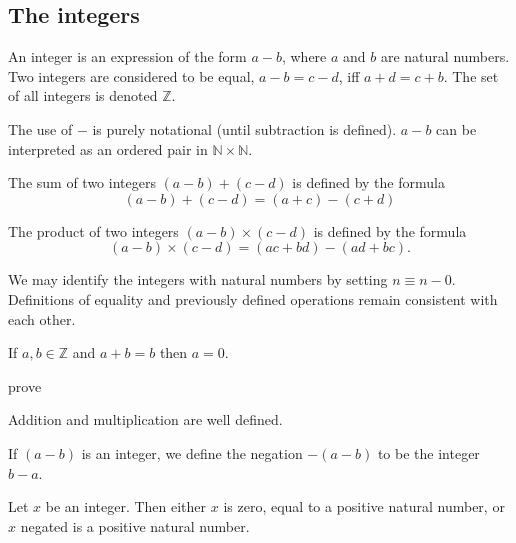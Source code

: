 \documentclass{article}
\begin{document}
\subsection{The integers}
\begin{definition}[Integers]
	An integer is an expression of the form \(a-b\), where \(a\) and \(b\) are natural numbers. Two integers are considered to be equal, \(a-b=c-d\), iff \(a+d=c+b\). The set of all integers is denoted \(\mathbb{Z}\).
\end{definition}
\begin{remark}
	The use of \(-\) is purely notational (until subtraction is defined). \(a-b\) can be interpreted as an ordered pair in \(\mathbb{N}\times\mathbb{N}\).
\end{remark}
\begin{definition}
	The sum of two integers \((a-b)+(c-d)\) is defined by the formula
	\begin{equation*}
		(a-b)+(c-d)=(a+c)-(c+d)
	\end{equation*}
\end{definition}
\begin{definition}
	The product of two integers \((a-b)\times (c-d)\) is defined by the formula
	\begin{equation*}
		(a-b)\times(c-d)=(ac+bd)-(ad+bc).
	\end{equation*}
\end{definition}
\begin{remark}
	We may identify the integers with natural numbers by setting \(n\equiv n-0\). Definitions of equality and previously defined operations remain consistent with each other.
\end{remark}
\begin{proposition}
	\label{addzero}
	If \(a,b\in\mathbb{Z}\) and \(a+b=b\) then \(a=0\).
	\begin{IEEEproof}
prove
	\end{IEEEproof}
\end{proposition}
\begin{lemma}
	Addition and multiplication are well defined.
\end{lemma}
\begin{definition}
	If \((a-b)\) is an integer, we define the negation \(-(a-b)\) to be the integer \(b-a\).
\end{definition}
\begin{lemma}
	Let \(x\) be an integer. Then either \(x\) is zero, equal to a positive natural number, or \(x\) negated is a positive natural number.
\end{lemma}
\end{document}
